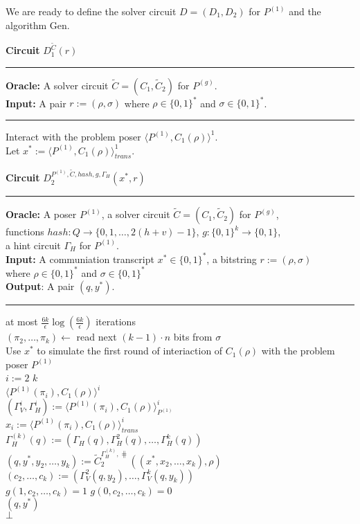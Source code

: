 %
We are ready to define the solver circuit $D = (D_1, D_2)$ for $P^{(1)}$ and the algorithm Gen.
%
\begin{codeblock}
  \textbf{Circuit} $D_1^{\widetilde{C}}(r)$
  \medskip \hrule \medskip
  \textbf{Oracle:} A solver circuit $\widetilde{C} = (C_1, \widetilde{C}_2)$ for $P^{(g)}$.\\
  \textbf{Input:} A pair $r := (\rho, \sigma)$ where $ \rho \in \{0,1\}^{*}$ and $\sigma \in \{0,1\}^{*}$.
  \medskip\hrule\medskip
  Interact with the problem poser $\langle P^{(1)}, C_1(\rho) \rangle^1$. \\
  Let $x^* := \langle P^{(1)}, C_1(\rho) \rangle^1_{\mathit{trans}}$.
\end{codeblock}
%
\begin{codeblock}
  \textbf{Circuit} $D_2^{P^{(1)}, \widetilde{C}, \mathit{hash}, g,  \Gamma_H}(x^*, r)$
  \medskip \hrule \medskip
  \textbf{Oracle:} A poser $P^{(1)}$, a solver circuit $\widetilde{C} = (C_1, \widetilde{C}_2)$ for $P^{(g)}$, \\
  \IndII functions $hash : Q \rightarrow \{0,1, \dots, 2(h+v)-1\}$, $g:\{0,1\}^k \rightarrow \{0,1\}$, \\
  \IndII a hint circuit $\Gamma_H$ for $P^{(1)}$. \\
  \textbf{Input:} A communiation transcript $x^* \in \{0,1\}^{*}$, a bitstring $r := (\rho, \sigma)$ \\
  \IndII where $\rho \in \{0,1\}^{*}$ and $\sigma \in \{0,1\}^{*}$\\
  \textbf{Output}: A pair $(q, y^*)$.
  \medskip \hrule \medskip
  \For at most $\frac{6k}{\epsilon} \log(\frac{6k}{\epsilon})$ iterations \Do \\
  \IndI $(\pi_2, \dots, \pi_k) \leftarrow$ read next $(k-1)\cdot n$ bits from $\sigma$ \\
  \IndI Use $x^*$ to simulate the first round of interiaction of $C_1(\rho)$ with the problem poser $P^{(1)}$\\
  \IndI \For $i:=2$ \To $k$ \Do \\
  \IndII \Run $\langle P^{(1)}(\pi_i), C_1(\rho)\rangle^i$ \\
  \IndIII $(\Gamma_V^{i}, \Gamma_H^{i}) := \langle P^{(1)}(\pi_i), C_1(\rho) \rangle^i_{P^{(1)}}$ \\
  \IndIII $x_i := \langle P^{(1)}(\pi_i), C_1(\rho) \rangle^i_{\mathit{trans}}$ \\
  \IndI $\Gamma_H^{(k)}(q) := (\Gamma_H(q), \Gamma_H^{2}(q), \dots, \Gamma_H^{k}(q))$ \\
  \IndI $(q, y^*, y_2, \dots, y_k) := \widetilde{C}_2^{\Gamma_H^{(k)}, \hash}((x^*, x_2, \dotsc, x_k), \rho)$\\
  \IndI $(c_2, \dots, c_k) := (\Gamma_V^2(q, y_2), \dotsc, \Gamma_V^{k}(q, y_k))$ \\
  \IndI \If $g(1, c_{2}, \dots, c_k) = 1$ \And $g(0,c_{2}, \dots, c_k) = 0$ \Then \\
  \IndII \Return $(q, y^*)$ \\
  \Return $\bot$
%
\end{codeblock}
